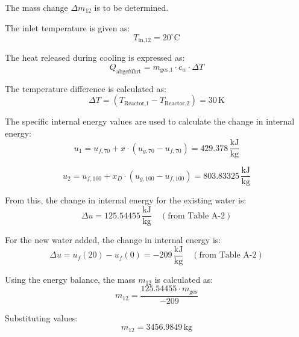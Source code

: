 The mass change \( \Delta m_{12} \) is to be determined.  

The inlet temperature is given as:  
\[
T_{\text{in,12}} = 20^\circ\text{C}
\]

The heat released during cooling is expressed as:  
\[
Q_{\text{abgeführt}} = m_{\text{ges,1}} \cdot c_w \cdot \Delta T
\]

The temperature difference is calculated as:  
\[
\Delta T = (T_{\text{Reactor,1}} - T_{\text{Reactor,2}}) = 30 \, \text{K}
\]

The specific internal energy values are used to calculate the change in internal energy:  
\[
u_1 = u_{f,70} + x \cdot (u_{g,70} - u_{f,70}) = 429.378 \, \frac{\text{kJ}}{\text{kg}}
\]

\[
u_2 = u_{f,100} + x_D \cdot (u_{g,100} - u_{f,100}) = 803.83325 \, \frac{\text{kJ}}{\text{kg}}
\]

From this, the change in internal energy for the existing water is:  
\[
\Delta u = 125.54455 \, \frac{\text{kJ}}{\text{kg}} \quad (\text{from Table A-2})
\]

For the new water added, the change in internal energy is:  
\[
\Delta u = u_f(20) - u_f(0) = -209 \, \frac{\text{kJ}}{\text{kg}} \quad (\text{from Table A-2})
\]

Using the energy balance, the mass \( m_{12} \) is calculated as:  
\[
m_{12} = \frac{125.54455 \cdot m_{\text{ges}}}{-209}
\]

Substituting values:  
\[
m_{12} = 3456.9849 \, \text{kg}
\]